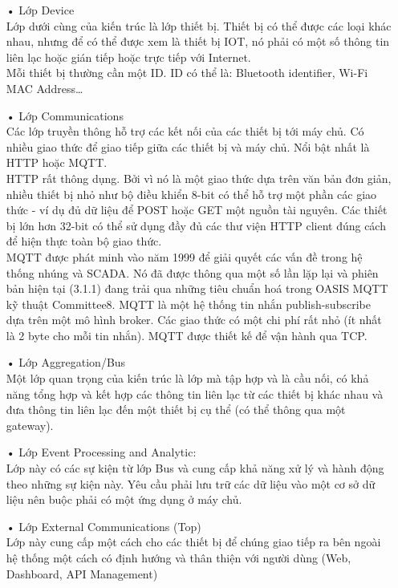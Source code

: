 \begin{itemize}
\item[•]Lớp Device \\
Lớp dưới cùng của kiến trúc là lớp thiết bị. Thiết bị có thể được các loại khác nhau, nhưng để có thể được xem là thiết bị IOT, nó phải có một số thông tin liên lạc hoặc gián tiếp hoặc trực tiếp với Internet.\\
Mỗi thiết bị thường cần một ID. ID có thể là: Bluetooth identifier, Wi-Fi MAC Address…
\item[•]Lớp Communications \\
Các lớp truyền thông hỗ trợ các kết nối của các thiết bị tới máy chủ. Có nhiều giao thức để giao tiếp giữa các thiết bị và máy chủ. Nổi bật nhất là HTTP hoặc MQTT.\\
HTTP rất thông dụng. Bởi vì nó là một giao thức dựa trên văn bản đơn giản, nhiều thiết bị nhỏ như bộ điều khiển 8-bit có thể hỗ trợ một phần các giao thức - ví dụ đủ dữ liệu để POST hoặc GET một nguồn tài nguyên. Các thiết bị lớn hơn 32-bit có thể sử dụng đầy đủ các thư viện HTTP client đúng cách để hiện thực toàn bộ giao thức.\\
MQTT được phát minh vào năm 1999 để giải quyết các vấn đề trong hệ thống nhúng và SCADA. Nó đã được thông qua một số lần lặp lại và phiên bản hiện tại (3.1.1) đang trải qua những tiêu chuẩn hoá trong OASIS MQTT kỹ thuật Committee8. MQTT là một hệ thống tin nhắn publish-subscribe dựa trên một mô hình broker. Các giao thức có một chi phí rất nhỏ (ít nhất là 2 byte cho mỗi tin nhắn). MQTT được thiết kế để vận hành qua TCP.
\item[•]Lớp Aggregation/Bus \\
Một lớp quan trọng của kiến trúc là lớp mà tập hợp và là cầu nối, có khả năng tổng hợp và kết hợp các thông tin liên lạc từ các thiết bị khác nhau và đưa thông tin liên lạc đến một thiết bị cụ thể (có thể thông qua một gateway).
\item[•]Lớp Event Processing and Analytic: \\
Lớp này có các sự kiện từ lớp Bus và cung cấp khả năng xử lý và hành động theo những sự kiện này. Yêu cầu phải lưu trữ các dữ liệu vào một cơ sở dữ liệu nên buộc phải có một ứng dụng ở máy chủ.
\item[•]Lớp External Communications (Top) \\
Lớp này cung cấp một cách cho các thiết bị để chúng giao tiếp ra bên ngoài hệ thống một cách có định hướng và thân thiện với người dùng (Web, Dashboard, API Management)
\end{itemize}

